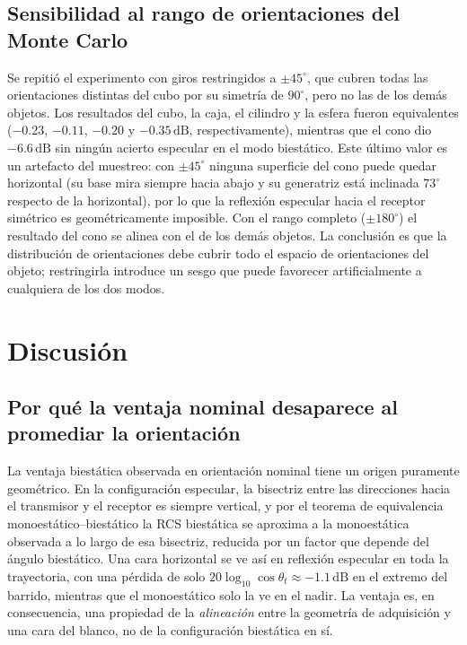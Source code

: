 \documentclass[11pt,a4paper]{report}
\newcommand{\dB}{\,\mathrm{dB}}
\begin{document}
\section{Sensibilidad al rango de orientaciones del Monte Carlo}
\label{sec:sensibilidad}

Se repitió el experimento con giros
restringidos a $\pm45^\circ$, que cubren todas las orientaciones distintas
del cubo por su simetría de $90^\circ$, pero no las de los demás objetos.
Los resultados del cubo, la caja, el cilindro y la esfera fueron
equivalentes ($-0.23$, $-0.11$, $-0.20$ y $-0.35\dB$, respectivamente),
mientras que el cono dio $-6.6\dB$ sin ningún acierto especular en el modo
biestático. Este último valor es un artefacto del muestreo: con
$\pm45^\circ$ ninguna superficie del cono puede quedar horizontal (su base
mira siempre hacia abajo y su generatriz está inclinada $73^\circ$ respecto
de la horizontal), por lo que la reflexión especular hacia el receptor
simétrico es geométricamente imposible. Con el rango completo
($\pm180^\circ$) el resultado del cono se alinea con el de los demás
objetos. La conclusión es que la distribución de orientaciones debe
cubrir todo el espacio de orientaciones del objeto; restringirla introduce
un sesgo que puede favorecer artificialmente a cualquiera de los dos modos.

\chapter{Discusión}
\label{cap:discusion}

\section{Por qué la ventaja nominal desaparece al promediar la orientación}
\label{sec:disc_promedio}

La ventaja biestática observada en orientación nominal tiene un origen
puramente geométrico. En la configuración especular, la bisectriz entre las
direcciones hacia el transmisor y el receptor es siempre vertical, y por el
teorema de equivalencia monoestático--biestático \cite{kell1965,willis1991}
la RCS biestática se aproxima a la monoestática observada a lo largo de esa
bisectriz, reducida por un factor que depende del ángulo biestático. Una
cara horizontal se ve así en reflexión especular en toda la trayectoria, con
una pérdida de solo $20\log_{10}\cos\theta_t\approx-1.1\dB$ en el extremo
del barrido, mientras que el monoestático solo la ve en el nadir. La
ventaja es, en consecuencia, una propiedad de la \emph{alineación} entre la
geometría de adquisición y una cara del blanco, no de la configuración
biestática en sí.
\end{document}
